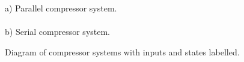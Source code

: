 \begin{figure}
    
    {\centering a) Parallel compressor system.\\}
    \\
    {\centering b) Serial compressor system.\\}
  \caption[Diagram of compressor systems.]{Diagram of compressor systems with inputs and states labelled.}
  \label{fig:comp-systems-diagrams}
\end{figure}


